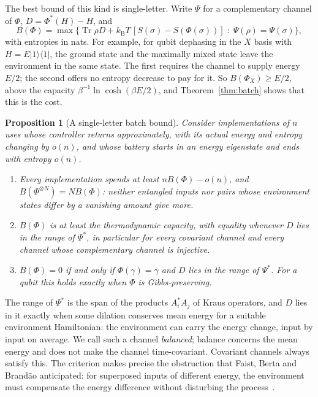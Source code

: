 \documentclass[11pt]{article}
\newtheorem{proposition}[theorem]{Proposition}
\theoremstyle{definition}
\theoremstyle{remark}
\newcommand{\Tr}{\operatorname{Tr}}
\newcommand{\kB}{k_{\mathrm B}}
\begin{document}
The best bound of this kind is single-letter. Write $\Psi$ for a complementary channel of $\Phi$, $D=\Phi^*(H)-H$, and
\[
B(\Phi)=\max\bigl\{\Tr\rho D+\kB T\,[S(\sigma)-S(\Phi(\sigma))]\;:\;\Psi(\rho)=\Psi(\sigma)\bigr\},
\]
with entropies in nats. For example, for qubit dephasing in the $X$ basis with $H=E|1\rangle\langle1|$, the ground state and the maximally mixed state leave the environment in the same state. The first requires the channel to supply energy $E/2$; the second offers no entropy decrease to pay for it. So $B(\Phi_X)\ge E/2$, above the capacity $\beta^{-1}\ln\cosh(\beta E/2)$, and Theorem~\ref{thm:batch} shows that this is the cost.

\begin{proposition}[A single-letter batch bound]\label{prop:single}
Consider implementations of $n$ uses whose controller returns approximately, with its actual energy and entropy changing by $o(n)$, and whose battery starts in an energy eigenstate and ends with entropy $o(n)$.
\begin{enumerate}[label=(\alph*)]
\item Every implementation spends at least $nB(\Phi)-o(n)$, and $B(\Phi^{\otimes N})=NB(\Phi)$: neither entangled inputs nor pairs whose environment states differ by a vanishing amount give more.
\item $B(\Phi)$ is at least the thermodynamic capacity, with equality whenever $D$ lies in the range of $\Psi^*$, in particular for every covariant channel and every channel whose complementary channel is injective.
\item $B(\Phi)=0$ if and only if $\Phi(\gamma)=\gamma$ and $D$ lies in the range of $\Psi^*$. For a qubit this holds exactly when $\Phi$ is Gibbs-preserving.
\end{enumerate}
\end{proposition}

The range of $\Psi^*$ is the span of the products $A_i^*A_j$ of Kraus operators, and $D$ lies in it exactly when some dilation conserves mean energy for a suitable environment Hamiltonian: the environment can carry the energy change, input by input on average. We call such a channel \emph{balanced}; balance concerns the mean energy and does not make the channel time-covariant. Covariant channels always satisfy this. The criterion makes precise the obstruction that Faist, Berta and Brand\~ao anticipated: for superposed inputs of different energy, the environment must compensate the energy difference without disturbing the process~\cite{FBB19}.
\end{document}
